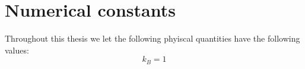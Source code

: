 %
\section{Numerical constants}
Throughout this thesis we let the following phyiscal quantities have the following values:
\begin{equation}
  k_B = 1
  \label{}
\end{equation}


